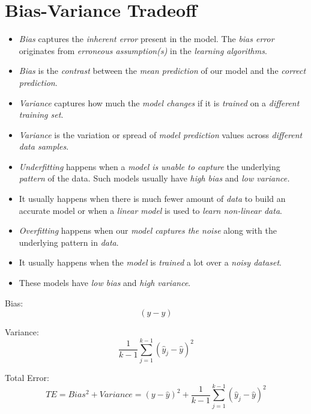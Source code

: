 \documentclass[
	number={5},
	title={Linear Regression}
]{cs584notes}
\begin{document}
\section{Bias-Variance Tradeoff}\label{sec:bias-variance-tradeoff}
\begin{itemize}
	\item \emph{Bias} captures the \emph{inherent error} present in the model.
	The \emph{bias error} originates from \emph{erroneous assumption(s)} in the \emph{learning algorithms}.
	\item \emph{Bias} is the \emph{contrast} between the \emph{mean prediction} of our model and the \emph{correct prediction}.
	\item \emph{Variance} captures how much the \emph{model changes} if it is \emph{trained} on a \emph{different training set}.
	\item \emph{Variance} is the variation or spread of \emph{model prediction} values across \emph{different data samples}.
	\item \emph{Underfitting} happens when a \emph{model is unable to capture} the underlying \emph{pattern} of the data.
	Such models usually have \emph{high bias} and \emph{low variance.}
	\item It usually happens when there is much fewer amount of \emph{data} to build an accurate model or when a \emph{linear model} is used to \emph{learn non-linear data}.
	\item \emph{Overfitting} happens when our \emph{model captures the noise} along with the underlying pattern in \emph{data}.
	\item It usually happens when the \emph{model} is \emph{trained} a lot over a \emph{noisy dataset}.
	\item These models have \emph{low bias} and \emph{high variance}.
\end{itemize}

Bias:
\begin{equation}
	(y - \hat{y})
	\label{eq:bias}
\end{equation}

Variance:
\begin{equation}
	\frac{1}{k-1} \sum_{j=1}^{k-1} \left( \hat{y}_{j} - \hat{y} \right)^{2}
	\label{eq:variance}
\end{equation}

Total Error:
\begin{equation}
	TE = Bias^{2} + Variance = (y - \hat{y})^{2} + \frac{1}{k-1} \sum_{j=1}^{k-1} \left( \hat{y}_{j} - \hat{y} \right)^{2}
	\label{eq:total-error}
\end{equation}
\end{document}
